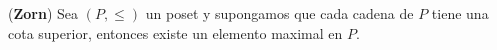   \begin{lemma}
    \PN (\textbf{Zorn}) Sea $(P, \leq)$ un poset y supongamos que cada cadena de $P$ tiene una cota superior, entonces
    existe un elemento maximal en $P$.
  \end{lemma}
